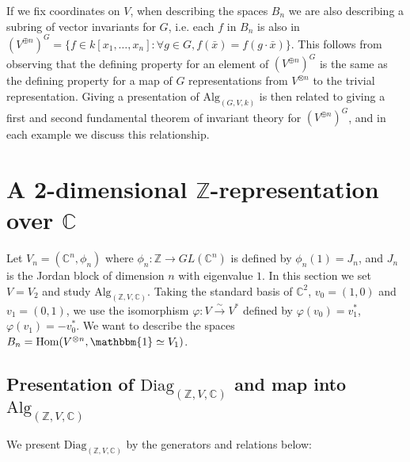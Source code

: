\documentclass[11pt]{article} %
\begin{document}
If we fix coordinates on $V$, when describing the spaces $B_n$ we are also describing a subring of vector invariants for $G$, i.e. each $f$ in $B_n$ is also in $(V^{\oplus n})^G=\{f \in k[x_1,\ldots,x_n] : \forall g \in G, f(\bar{x}) = f(g \cdot \bar{x})\}$. This follows from observing that the defining property for an element of $(V^{\oplus n})^G$ is the same as the defining property for a map of $G$ representations from $V^{\otimes n}$ to the trivial representation. Giving a presentation of $\text{Alg}_{(G,V,k)}$ is then related to giving a first and second fundamental theorem of invariant theory for $(V^{\oplus n})^G$, and in each example we discuss this relationship.


\section{A 2-dimensional $\mathbb{Z}$-representation over $\mathbb{C}$}

Let $V_n=(\mathbb{C}^n,\phi_n)$ where $\phi_n: \mathbb{Z} \rightarrow GL(\mathbb{C}^n)$ is defined by $\phi_n(1)=J_n$, and $J_n$ is the Jordan block of dimension $n$ with eigenvalue $1$. In this section we set $V=V_2$ and study $\text{Alg}_{(\mathbb{Z},V, \mathbb{C})}$. Taking the standard basis of $\mathbb{C}^2$, $v_0 = (1,0)$ and  $v_1 = (0,1)$, we use the isomorphism $\varphi:V \xrightarrow{\sim} V^{\ast}$ defined by $\varphi(v_0)=v_1^{\ast}$, $\varphi(v_1)=-v_0^{\ast}$. We want to describe the spaces $B_n = \text{Hom}(V^{\otimes n},\mathbbm{1} \simeq V_1)$.

\subsection {Presentation of $\text{Diag}_{(\mathbb{Z},V,\mathbb{C})}$ and map into $\text{Alg}_{(\mathbb{Z},V,\mathbb{C})}$}

\begin{mydef}
We present $\text{Diag}_{(\mathbb{Z},V,\mathbb{C})}$ by the generators and relations below:
\end{mydef}
\end{document}
